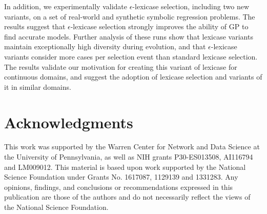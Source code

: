 \documentclass[twoside]{article}
\begin{document}
In addition, we experimentally validate $\epsilon$-lexicase selection, including two new variants, on a set of real-world and synthetic symbolic regression problems. The results suggest that $\epsilon$-lexicase selection strongly improves the ability of GP to find accurate models. Further analysis of these runs show that lexicase variants maintain exceptionally high diversity during evolution, and that $\epsilon$-lexicase variants consider more cases per selection event than standard lexicase selection. The results validate our motivation for creating this variant of lexicase for continuous domains, and suggest the adoption of lexicase selection and variants of it in similar domains.  

\section{Acknowledgments}
This work was supported by the Warren Center for Network and Data Science at the University of Pennsylvania, as well as NIH grants P30-ES013508, AI116794 and LM009012. This material is based upon work supported by the National Science Foundation under Grants No. 1617087, 1129139 and 1331283. Any opinions, findings, and conclusions or recommendations expressed in this publication are those of the authors and do not necessarily reflect the views of the National Science Foundation.




\end{document}
